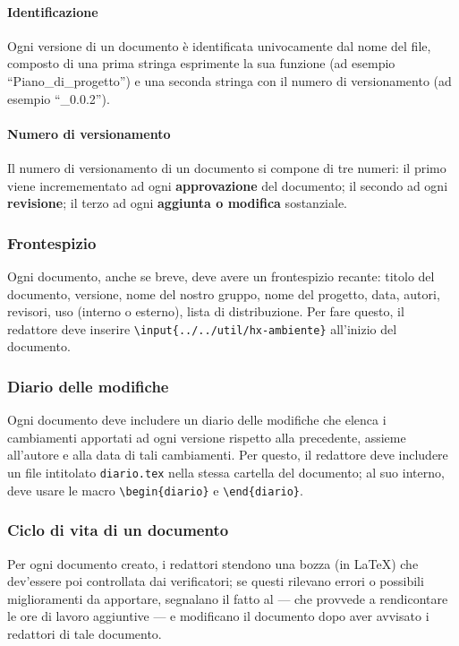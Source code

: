\paragraph{Identificazione} Ogni versione di un documento è identificata univocamente dal nome del file, composto di una prima stringa esprimente la sua funzione (ad esempio “Piano\_di\_progetto”) e una seconda stringa con il numero di versionamento (ad esempio “\_0.0.2”).
\paragraph{Numero di versionamento} Il numero di versionamento di un documento si compone di tre numeri: il primo viene incremementato ad ogni \textbf{approvazione} del documento; il secondo ad ogni \textbf{revisione}; il terzo ad ogni \textbf{aggiunta o modifica} sostanziale.

\subsubsection{Frontespizio} Ogni documento, anche se breve, deve avere un frontespizio recante: titolo del documento, versione, nome del nostro gruppo, nome del progetto, data, autori, revisori, uso (interno o esterno), lista di distribuzione. Per fare questo, il redattore deve inserire \texttt{\textbackslash input\{../../util/hx-ambiente\}} all'inizio del documento.

\subsubsection{Diario delle modifiche} Ogni documento deve includere un diario delle modifiche che elenca i cambiamenti apportati ad ogni versione rispetto alla precedente, assieme all'autore e alla data di tali cambiamenti. Per questo, il redattore deve includere un file intitolato \texttt{diario.tex} nella stessa cartella del documento; al suo interno, deve usare le macro \texttt{\textbackslash begin\{diario\}} e \texttt{\textbackslash end\{diario\}}.

\subsubsection{Ciclo di vita di un documento} Per ogni documento creato, i redattori stendono una bozza (in \LaTeX) che dev'essere poi controllata dai verificatori; se questi rilevano errori o possibili miglioramenti da apportare, segnalano il fatto al  --- che provvede a rendicontare le ore di lavoro aggiuntive --- e modificano il documento dopo aver avvisato i redattori di tale documento.

